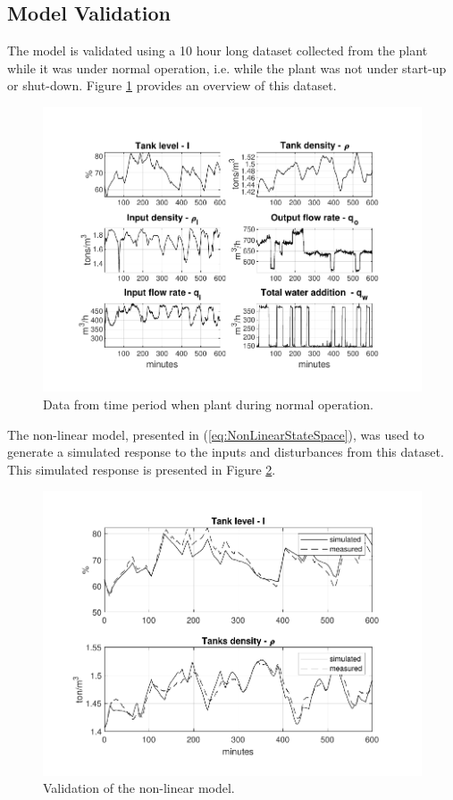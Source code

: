 \documentclass[preprint,authoryear,12pt]{elsarticle}
\begin{document}
\subsection{Model Validation}\label{sec:ModelValidation}
The model is validated using a 10 hour long dataset collected from the plant while it was under normal operation, i.e. while the plant was not under start-up or shut-down. Figure \ref{fig:DataSet} provides an overview of this dataset.
\begin{figure}[t!]
	\centering
	\includegraphics[trim={0.8cm, 0.8cm, 0.8cm, 0.8cm}, clip, width=\textwidth]{data_inspection.pdf}
	\caption{Data from time period when plant during normal operation.}
	\label{fig:DataSet}
\end{figure}

The non-linear model, presented in (\ref{eq:NonLinearStateSpace}), was used to generate a simulated response to the inputs and disturbances from this dataset. This simulated response is presented in Figure \ref{fig:ModelValidationNL}.
\begin{figure}[t!]
	\centering
	\includegraphics[trim={0.8cm, 0.8cm, 0.8cm, 0.8cm}, clip, width=\textwidth]{model_validation_nl.pdf}
	\caption{Validation of the non-linear model.}
	\label{fig:ModelValidationNL}
\end{figure}
\end{document}
